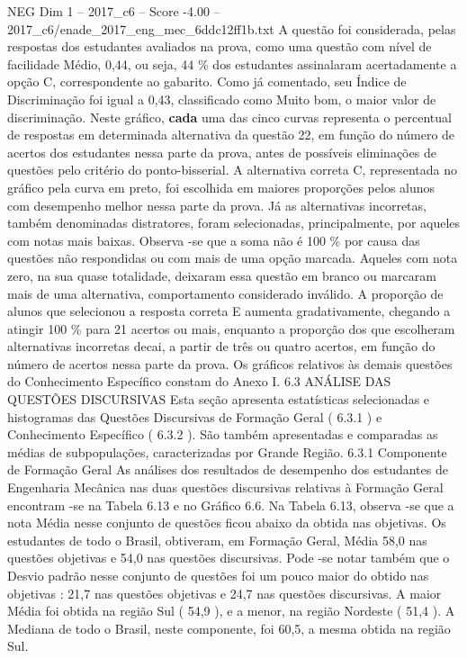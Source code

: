 \begin{textsample}{NEG Dim 1 – 2017\_c6 – Score -4.00 – 2017\_c6/enade\_2017\_eng\_mec\_6ddc12ff1b.txt}
A questão foi considerada, pelas respostas dos estudantes avaliados na prova, como uma questão com nível de facilidade Médio, 0,44, ou seja, 44 \% dos estudantes assinalaram acertadamente a opção C, correspondente ao gabarito.
Como já comentado, seu Índice de Discriminação foi igual a 0,43, classificado como Muito bom, o maior valor de discriminação.
Neste gráfico, \textbf{cada} uma das cinco curvas representa o percentual de respostas em determinada alternativa da questão 22, em função do número de acertos dos estudantes nessa parte da prova, antes de possíveis eliminações de questões pelo critério do ponto-bisserial.
A alternativa correta C, representada no gráfico pela curva em preto, foi escolhida em maiores proporções pelos alunos com desempenho melhor nessa parte da prova.
Já as alternativas incorretas, também denominadas distratores, foram selecionadas, principalmente, por aqueles com notas mais baixas.
Observa -se que a soma não é 100 \% por causa das questões não respondidas ou com mais de uma opção marcada.
Aqueles com nota zero, na sua quase totalidade, deixaram essa questão em branco ou marcaram mais de uma alternativa, comportamento considerado inválido.
A proporção de alunos que selecionou a resposta correta E aumenta gradativamente, chegando a atingir 100 \% para 21 acertos ou mais, enquanto a proporção dos que escolheram alternativas incorretas decai, a partir de três ou quatro acertos, em função do número de acertos nessa parte da prova.
Os gráficos relativos às demais questões do Conhecimento Específico constam do Anexo I. 6.3 ANÁLISE DAS QUESTÕES DISCURSIVAS Esta seção apresenta estatísticas selecionadas e histogramas das Questões Discursivas de Formação Geral ( 6.3.1 ) e Conhecimento Específico ( 6.3.2 ).
São também apresentadas e comparadas as médias de subpopulações, caracterizadas por Grande Região. 6.3.1 Componente de Formação Geral As análises dos resultados de desempenho dos estudantes de Engenharia Mecânica nas duas questões discursivas relativas à Formação Geral encontram -se na Tabela 6.13 e no Gráfico 6.6.
Na Tabela 6.13, observa -se que a nota Média nesse conjunto de questões ficou abaixo da obtida nas objetivas.
Os estudantes de todo o Brasil, obtiveram, em Formação Geral, Média 58,0 nas questões objetivas e 54,0 nas questões discursivas.
Pode -se notar também que o Desvio padrão nesse conjunto de questões foi um pouco maior do obtido nas objetivas : 21,7 nas questões objetivas e 24,7 nas questões discursivas.
A maior Média foi obtida na região Sul ( 54,9 ), e a menor, na região Nordeste ( 51,4 ).
A Mediana de todo o Brasil, neste componente, foi 60,5, a mesma obtida na região Sul.

\end{textsample}
